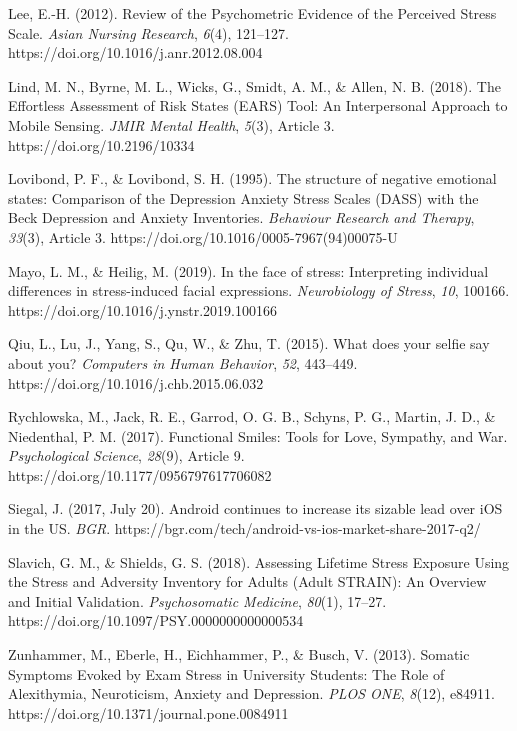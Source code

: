 \documentclass[authordate, empirical]{jote-new-article}
\begin{document}
Lee, E.-H. (2012). Review of the Psychometric Evidence of the Perceived Stress Scale. \emph{Asian Nursing Research}, \emph{6}(4), 121--127. https://doi.org/10.1016/j.anr.2012.08.004

\balance

Lind, M. N., Byrne, M. L., Wicks, G., Smidt, A. M., \& Allen, N. B. (2018). The Effortless Assessment of Risk States (EARS) Tool: An Interpersonal Approach to Mobile Sensing. \emph{JMIR Mental Health}, \emph{5}(3), Article 3. https://doi.org/10.2196/10334



Lovibond, P. F., \& Lovibond, S. H. (1995). The structure of negative emotional states: Comparison of the Depression Anxiety Stress Scales (DASS) with the Beck Depression and Anxiety Inventories. \emph{Behaviour Research and Therapy}, \emph{33}(3), Article 3. https://doi.org/10.1016/0005-7967(94)00075-U



Mayo, L. M., \& Heilig, M. (2019). In the face of stress: Interpreting individual differences in stress-induced facial expressions. \emph{Neurobiology of Stress}, \emph{10}, 100166. https://doi.org/10.1016/j.ynstr.2019.100166



Qiu, L., Lu, J., Yang, S., Qu, W., \& Zhu, T. (2015). What does your selfie say about you? \emph{Computers in Human Behavior}, \emph{52}, 443--449. https://doi.org/10.1016/j.chb.2015.06.032



Rychlowska, M., Jack, R. E., Garrod, O. G. B., Schyns, P. G., Martin, J. D., \& Niedenthal, P. M. (2017). Functional Smiles: Tools for Love, Sympathy, and War. \emph{Psychological Science}, \emph{28}(9), Article 9. https://doi.org/10.1177/0956797617706082



Siegal, J. (2017, July 20). Android continues to increase its sizable lead over iOS in the US. \emph{BGR}. https://bgr.com/tech/android-vs-ios-market-share-2017-q2/



Slavich, G. M., \& Shields, G. S. (2018). Assessing Lifetime Stress Exposure Using the Stress and Adversity Inventory for Adults (Adult STRAIN): An Overview and Initial Validation. \emph{Psychosomatic Medicine}, \emph{80}(1), 17--27. https://doi.org/10.1097/PSY.0000000000000534



Zunhammer, M., Eberle, H., Eichhammer, P., \& Busch, V. (2013). Somatic Symptoms Evoked by Exam Stress in University Students: The Role of Alexithymia, Neuroticism, Anxiety and Depression. \emph{PLOS ONE}, \emph{8}(12), e84911. https://doi.org/10.1371/journal.pone.0084911
\end{document}
